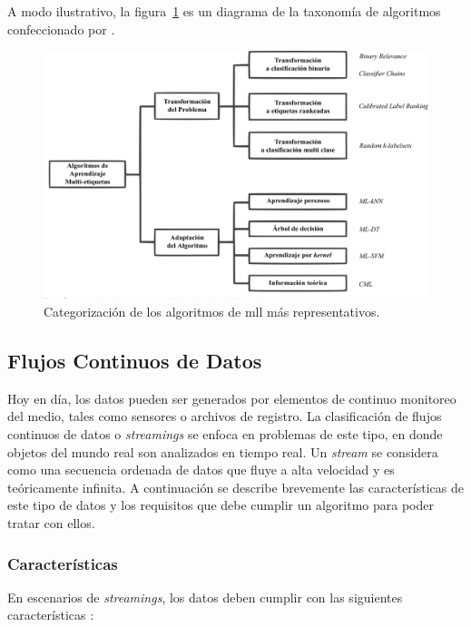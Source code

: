 A modo ilustrativo, la figura~\ref{fig:algorithm_taxonomy} es un diagrama de la
taxonomía de algoritmos confeccionado por \citeauthor{zhang_review_2014} \cite
{zhang_review_2014}.

\begin{figure}
	\includegraphics[width=\linewidth]{figures/algorithm_taxonomy.png}
	\caption{Categorización de los algoritmos de \acrshort{mll} más representativos.}
	\label{fig:algorithm_taxonomy}
\end{figure}

\subsection{Flujos Continuos de Datos}
\label{intro_streams}

Hoy en día, los datos pueden ser generados por elementos de continuo monitoreo
del medio, tales como sensores o archivos de registro.  La clasificación de
flujos continuos de datos o \textit{streamings} se enfoca en problemas de este
tipo, en donde objetos del mundo real son analizados en tiempo real. Un
\textit{stream} se considera como una secuencia ordenada de datos que fluye a
alta velocidad y es teóricamente infinita. A continuación se describe brevemente
las características de este tipo de datos y los requisitos que debe cumplir un
algoritmo para poder tratar con ellos.

\subsubsection{Características}
\label{stream_caracteristicas}

En escenarios de \textit{streamings}, los datos deben cumplir con las siguientes
características \cite {gama_knowledge_2010}:

